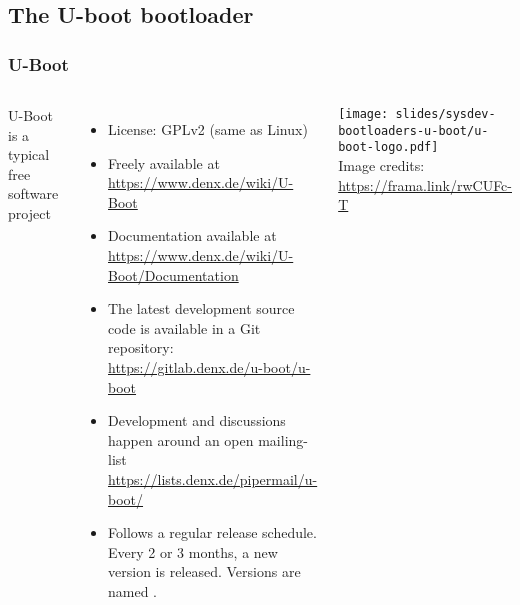 \subsection{The U-boot bootloader}

\begin{frame}
  \frametitle{U-Boot}
  \begin{columns}
      U-Boot is a typical free software project
      \begin{itemize}
      \item License: GPLv2 (same as Linux)
      \item Freely available at \url{https://www.denx.de/wiki/U-Boot}
      \item Documentation available at
        \url{https://www.denx.de/wiki/U-Boot/Documentation}
      \item The latest development source code is available in a Git
        repository:
        \url{https://gitlab.denx.de/u-boot/u-boot}
      \item Development and discussions happen around an open mailing-list
        \url{https://lists.denx.de/pipermail/u-boot/}
      \item Follows a regular release schedule. Every 2 or 3 months,
        a new version is released. Versions are named .
      \end{itemize}
      \texttt{[image: slides/sysdev-bootloaders-u-boot/u-boot-logo.pdf]}\\
      \tiny Image credits: \url{https://frama.link/rwCUFc-T}
  \end{columns}
\end{frame}


